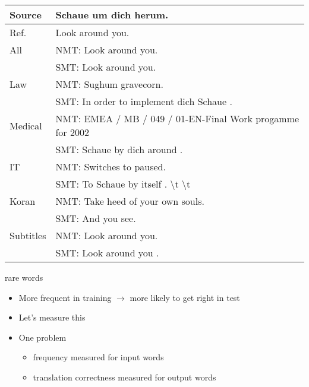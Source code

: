 \documentclass[landscape]{jhuslides3C}
\begin{document}
\vfill
\begin{tabular}{l|p{22cm}}
Source & Schaue um dich herum.\\ \hline
Ref. & Look around you. \\ \hline \hline
All & NMT: Look around you.\\
& SMT: Look around you.\\\hline
Law & NMT: Sughum gravecorn.\\
& SMT: In order to implement dich Schaue .\\\hline
Medical & NMT: EMEA / MB / 049 / 01-EN-Final Work progamme for 2002\\
& SMT: Schaue by dich around .\\\hline
IT & NMT: Switches to paused.\\
& SMT: To Schaue by itself . \textbackslash t \textbackslash t\\\hline
Koran & NMT: Take heed of your own souls.\\
& SMT: And you see. \\\hline
Subtitles & NMT: Look around you.\\
& SMT: Look around you .
\end{tabular}
\vfill



\slide{}
\vfill
\begin{center}
{\huge rare words}
\end{center}
\vfill


\vfill
\begin{itemize}
\item More frequent in training $\rightarrow$ more likely to get right in test
\item Let's measure this\pause
\item One problem
\begin{itemize}\itemsep 2mm
\item frequency measured for input words
\item translation correctness measured for output words
\end{itemize}
\end{itemize}
\vfill

\end{document}
